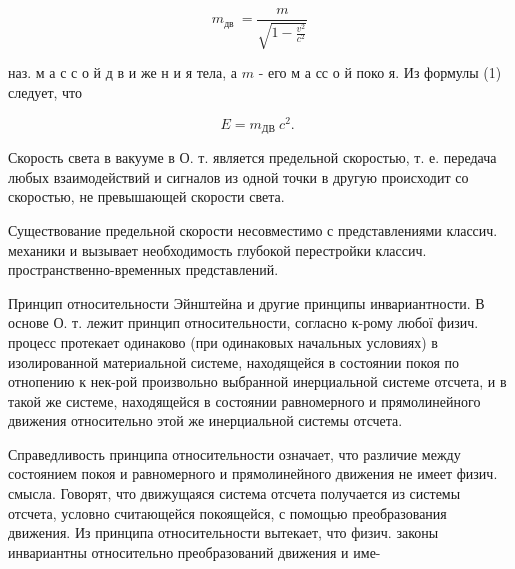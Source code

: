 \documentclass[10pt]{article}
\begin{document}
\[
m_{\text {дв }}=\frac{m}{\sqrt{1-\frac{v^{2}}{c^{2}}}}
\]

наз. м а с с о й д в и же н и я тела, а $m$ - его м а сс о й поко я. Из формулы (1) следует, что

\[
E=m_{\text {ДВ }} c^{2} \text {. }
\]

Скорость света в вакууме в О. т. является предельной скоростью, т. е. передача любых взаимодействий и сигналов из одной точки в другую происходит со скоростью, не превышающей скорости света.

Существование предельной скорости несовместимо с представлениями классич. механики и вызывает необходимость глубокой перестройки классич. пространственно-временных представлений.

Принцип относительности Эйнштейна и другие принципы инвариантности. В основе О. т. лежит принцип относительности, согласно к-рому любої физич. процесс протекает одинаково (при одинаковых начальных условиях) в изолированной материальной системе, находящейся в состоянии покоя по отнопению к нек-рой произвольно выбранной инерциальной системе отсчета, и в такой же системе, находящейся в состоянии равномерного и прямолинейного движения относительно этой же инерциальной системы отсчета.

Справедливость принципа относительности означает, что различие между состоянием покоя и равномерного и прямолинейного движения не имеет физич. смысла. Говорят, что движущаяся система отсчета получается из системы отсчета, условно считающейся покоящейся, с помощью преобразования движения. Из принципа относительности вытекает, что физич. законы инвариантны относительно преобразований движения и име-
\end{document}
